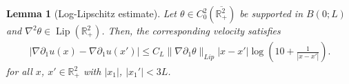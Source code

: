 \documentclass[10pt]{amsart}
\newtheorem{lemma}[theorem]{Lemma}
\theoremstyle{definition}
\theoremstyle{remark}
\numberwithin{equation}{section}
\newcommand{\0}{\emptyset}
\newcommand{\ohp}{\overline{\bbR^2_+}}
\newcommand{\tht}{\theta}
\newcommand{\bbR}{\mathbb R}
\begin{document}
	
	\begin{lemma}[Log-Lipschitz estimate]
		Let $\tht \in C^{2}_{0}(\ohp)$ be supported in $B(0;L)$  and $\nabla^2 \tht \in \operatorname{Lip}(\bbR^2_{+})$. Then, the corresponding velocity  satisfies \begin{equation}\label{eq:log-Lipschitz}
			\begin{split}
				|\nabla \partial_1 u(x) - \nabla \partial_1 u(x')| \leq C_L \| \nabla \partial_1 \tht \|_{Lip} |x-x'| \log \left( 10 +\frac{1}{|x-x'|} \right).
			\end{split}
		\end{equation} 
		for all $x$, $x' \in \bbR^2_{+}$ with $|x_1|$, $|x_1'| < 3L$. 
	\end{lemma}
\end{document}
